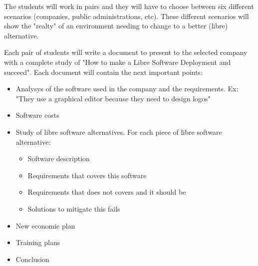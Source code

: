 \documentclass[a4paper]{article}
\begin{document}
The students will work in pairs and they will have to choose between six different scenarios (companies, public administrations, etc). These different scenarios will show the "realty" of an environment needing to change to a better (libre) alternative. 

Each pair of students will write a document to present to the selected company with a complete study of "How to make a Libre Software Deployment and succeed". Each document will contain the next important points:

\begin{itemize}
\item Analysys of the software used in the company and the requirements. Ex: "They use a graphical editor because they need to design logos"
\item Software costs
\item Study of libre software alternatives. For each piece of libre software alternative:
	\begin{itemize}
	\item Software description
	\item Requirements that covers this software
	\item Requirements that does not covers and it should be
	\item Solutions to mitigate this fails
	\end{itemize}
\item New economic plan
\item Training plans 
\item Conclusion

\end{itemize}


\end{document}
